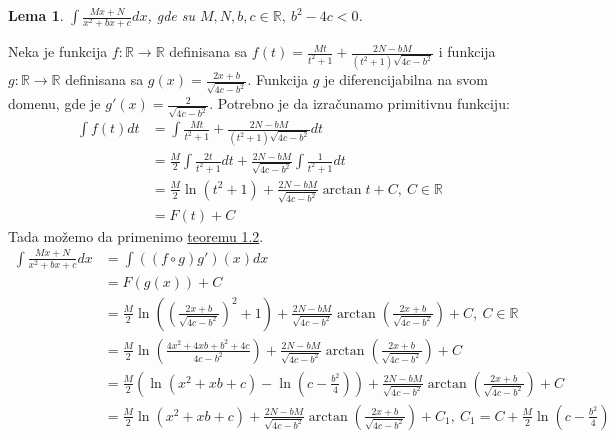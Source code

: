 \documentclass{article}
\newtheorem{lema}{Lema}[section]
\begin{document}
\begin{lemabox}
    \begin{lema}
        \label{lema_1.1.3}
        $\int \frac{Mx+N}{x^2+bx+c}dx$, gde su $M,N,b,c\in\mathbb{R},\ b^2 - 4c < 0$.
    \end{lema}
    Neka je funkcija $f:\mathbb{R}\rightarrow\mathbb{R}$ definisana sa
    $f(t)=\frac{Mt}{t^2+1}+\frac{2N-bM}{(t^2+1)\sqrt{4c-b^2}}$ i funkcija $g:\mathbb{R}\rightarrow\mathbb{R}$
    definisana sa $g(x)=\frac{2x+b}{\sqrt{4c-b^2}}$. Funkcija $g$ je diferencijabilna na svom domenu, gde je $g'(x)=\frac{2}{\sqrt{4c-b^2}}$.
    Potrebno je da izračunamo primitivnu funkciju:
    \begin{align*}
        \int f(t)dt & =\int \frac{Mt}{t^2+1}+\frac{2N-bM}{(t^2+1)\sqrt{4c-b^2}}dt                          \\
                    & =\frac{M}{2}\int \frac{2t}{t^2+1}dt+\frac{2N-bM}{\sqrt{4c-b^2}}\int\frac{1}{t^2+1}dt \\
                    & =\frac{M}{2}\ln(t^2+1)+\frac{2N-bM}{\sqrt{4c-b^2}}\arctan{t}+C,\ C\in\mathbb{R}      \\
                    & =F(t)+C
    \end{align*}
    Tada možemo da primenimo \hyperref[teorema_1.2]{teoremu 1.2}.
    \begin{align*}
        \int \frac{Mx+N}{x^2+bx+c}dx & = \int ((f\circ g) g')(x)dx                                                                                                               \\
                                     & = F(g(x)) + C                                                                                                                             \\
                                     & = \frac{M}{2}\ln((\frac{2x+b}{\sqrt{4c-b^2}})^2+1)+\frac{2N-bM}{\sqrt{4c-b^2}}\arctan({\frac{2x+b}{\sqrt{4c-b^2}}})+ C,\ C\in\mathbb{R}   \\
                                     & = \frac{M}{2}\ln(\frac{4x^2+4xb+b^2+4c}{4c-b^2})+\frac{2N-bM}{\sqrt{4c-b^2}}\arctan({\frac{2x+b}{\sqrt{4c-b^2}}})+ C                      \\
                                     & = \frac{M}{2}(\ln(x^2+xb+c)-\ln(c-\frac{b^2}{4}))+\frac{2N-bM}{\sqrt{4c-b^2}}\arctan({\frac{2x+b}{\sqrt{4c-b^2}}})+ C                     \\
                                     & = \frac{M}{2}\ln(x^2+xb+c)+\frac{2N-bM}{\sqrt{4c-b^2}}\arctan({\frac{2x+b}{\sqrt{4c-b^2}}})+ C_1,\ C_1=C+ \frac{M}{2}\ln(c-\frac{b^2}{4}) \\
    \end{align*}
\end{lemabox}
\end{document}
